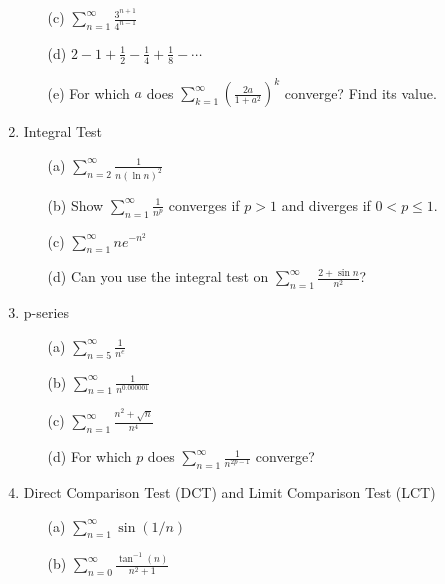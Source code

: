 \documentclass[12pt]{article}
\begin{document}
\begin{enumerate}
\begin{enumerate}
\item[(c)] $\sum_{n=1}^\infty\frac{3^{n+1}}{4^{n-1}}$

\item[(d)] $2-1+\frac12-\frac14+\frac18-\cdots$

\item[(e)] For which $a$ does $\sum_{k=1}^\infty\left(\frac{2a}{1+a^2}\right)^k$ converge? Find its value.

\end{enumerate}

\setcounter{enumi}{18}
\item Integral Test
\begin{enumerate}
\item[(a)] $\sum_{n=2}^\infty\frac{1}{n(\ln n)^2}$

\item[(b)] Show $\sum_{n=1}^\infty\frac{1}{n^p}$ converges if $p>1$ and diverges if $0<p\le1$.

\item[(c)] $\sum_{n=1}^\infty ne^{-n^2}$

\item[(d)] Can you use the integral test on $\sum_{n=1}^\infty\frac{2+\sin n}{n^2}$?

\end{enumerate}

\setcounter{enumi}{19}
\item p-series
\begin{enumerate}
\item[(a)] $\sum_{n=5}^\infty\frac{1}{n^e}$

\item[(b)] $\sum_{n=1}^\infty\frac{1}{n^{0.000001}}$

\item[(c)] $\sum_{n=1}^\infty\frac{n^2+\sqrt n}{n^4}$

\item[(d)] For which $p$ does $\sum_{n=1}^\infty\frac{1}{n^{2p-1}}$ converge?

\end{enumerate}

\setcounter{enumi}{20}
\item Direct Comparison Test (DCT) and Limit Comparison Test (LCT)
\begin{enumerate}
\item[(a)] $\sum_{n=1}^\infty\sin(1/n)$

\item[(b)] $\sum_{n=0}^\infty\frac{\tan^{-1}(n)}{n^2+1}$


\end{enumerate}
\end{enumerate}
\end{document}
